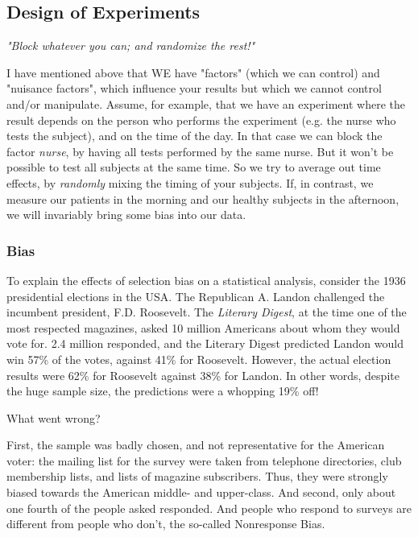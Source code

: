 \subsection{Design of Experiments}

\emph{"Block whatever you can; and randomize the rest!"}

\vspace{5 Mm}

I have mentioned above that WE have "factors" (which we can control) and "nuisance factors", which influence your results but which we cannot control and/or manipulate. Assume, for example, that we have an experiment where the result depends on the person who performs the experiment (e.g. the nurse who tests the subject), and on the time of the day. In that case we can \gls{block} the factor \emph{nurse}, by having all tests performed by the same nurse. But it won't be possible to test all subjects at the same time. So we try to average out time effects, by \emph{randomly} mixing the timing of your subjects. If, in contrast, we measure our patients in the morning and our healthy subjects in the afternoon, we will invariably bring some \gls{bias} into our data.

\subsubsection{Bias} 
To explain the effects of selection bias on a statistical analysis, consider the 1936 presidential elections in the USA. The Republican A. Landon challenged the incumbent president, F.D. Roosevelt. The \emph{Literary Digest}, at the time one of the most respected magazines, asked 10 million Americans about whom they would vote for. 2.4 million responded, and the Literary Digest predicted Landon would win 57\% of the votes, against 41\% for Roosevelt. However, the actual election results were 62\% for Roosevelt against 38\% for Landon. In other words, despite the huge sample size, the predictions were a whopping 19\% off!

What went wrong?

First, the sample was badly chosen, and not representative for the American voter: the mailing list for the survey were taken from telephone directories, club membership lists, and lists of magazine subscribers. Thus, they were strongly biased towards the American middle- and upper-class. And second, only about one fourth of the people asked responded. And people who respond to surveys are different from people who don't, the so-called Nonresponse Bias.

